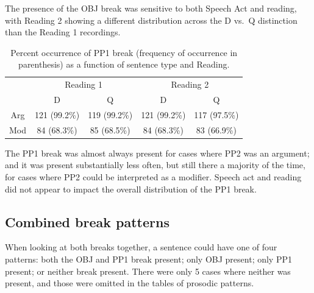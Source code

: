\documentclass[12pt,oneside]{book}
\begin{document}
The presence of the OBJ break was sensitive to both Speech Act and reading, with Reading 2 showing a different distribution across the D vs.~Q distinction than the Reading 1 recordings.

\begin{table}[!h]

\caption{\label{tab:pp1}Percent occurrence of PP1 break (frequency of occurrence in parenthesis) as a function of sentence type and Reading.}
\centering
\begin{tabular}{ccccc}
\toprule
\multicolumn{1}{c}{ } & \multicolumn{2}{c}{Reading 1} & \multicolumn{2}{c}{Reading 2} \\
\cmidrule(l{3pt}r{3pt}){2-3} \cmidrule(l{3pt}r{3pt}){4-5}
 & D & Q & D & Q\\
\midrule
Arg & 121 (99.2\%) & 119 (99.2\%) & 121 (99.2\%) & 117 (97.5\%)\\
Mod & 84 (68.3\%) & 85 (68.5\%) & 84 (68.3\%) & 83 (66.9\%)\\
\bottomrule
\end{tabular}
\end{table}

The PP1 break was almost always present for cases where PP2 was an argument; and it was present substantially less often, but still there a majority of the time, for cases where PP2 could be interpreted as a modifier. Speech act and reading did not appear to impact the overall distribution of the PP1 break.

\hypertarget{bbr}{%
\subsection{Combined break patterns}\label{bbr}}

When looking at both breaks together, a sentence could have one of four patterns: both the OBJ and PP1 break present; only OBJ present; only PP1 present; or neither break present. There were only 5 cases where neither was present, and those were omitted in the tables of prosodic patterns.
\end{document}
